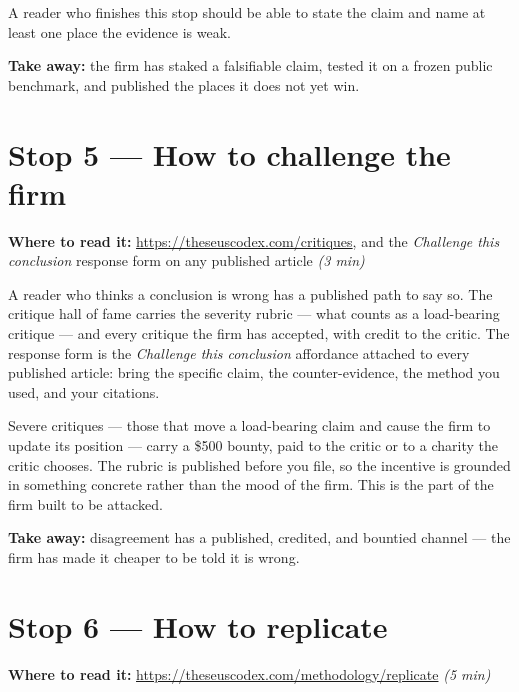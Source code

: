 \documentclass[11pt,letterpaper]{article}
\newcommand{\rt}[1]{\textsl{#1}}
\begin{document}
A reader who finishes this stop should be able to state the claim and name at least one place the evidence is weak.

\textbf{Take away:} the firm has staked a falsifiable claim, tested it on a frozen public benchmark, and published the places it does not yet win.

\section{Stop 5 --- How to challenge the firm}

\textbf{Where to read it:} \url{https://theseuscodex.com/critiques}, and the \emph{Challenge this conclusion} response form on any published article \quad \rt{(3 min)}

\medskip

A reader who thinks a conclusion is wrong has a published path to say so. The critique hall of fame carries the severity rubric --- what counts as a load-bearing critique --- and every critique the firm has accepted, with credit to the critic. The response form is the \emph{Challenge this conclusion} affordance attached to every published article: bring the specific claim, the counter-evidence, the method you used, and your citations.

Severe critiques --- those that move a load-bearing claim and cause the firm to update its position --- carry a \$500 bounty, paid to the critic or to a charity the critic chooses. The rubric is published before you file, so the incentive is grounded in something concrete rather than the mood of the firm. This is the part of the firm built to be attacked.

\textbf{Take away:} disagreement has a published, credited, and bountied channel --- the firm has made it cheaper to be told it is wrong.

\section{Stop 6 --- How to replicate}

\textbf{Where to read it:} \url{https://theseuscodex.com/methodology/replicate} \quad \rt{(5 min)}

\medskip
\end{document}
